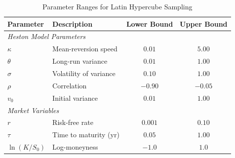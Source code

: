 \begin{table}[htbp]
\centering
\caption{Parameter Ranges for Latin Hypercube Sampling}
\label{tab:param_ranges}
\begin{tabular}{llcc}
\toprule
Parameter & Description & Lower Bound & Upper Bound \\
\midrule
\multicolumn{4}{l}{\textit{Heston Model Parameters}} \\
$\kappa$ & Mean-reversion speed      & $0.01$ & $5.00$ \\
$\theta$ & Long-run variance         & $0.01$ & $1.00$ \\
$\sigma$ & Volatility of variance    & $0.10$ & $1.00$ \\
$\rho$   & Correlation               & $-0.90$ & $-0.05$ \\
$v_0$    & Initial variance          & $0.01$ & $1.00$ \\
\midrule
\multicolumn{4}{l}{\textit{Market Variables}} \\
$r$             & Risk-free rate         & $0.001$ & $0.10$ \\
$\tau$          & Time to maturity (yr)  & $0.05$  & $1.00$ \\
$\ln(K/S_0)$    & Log-moneyness          & $-1.0$  & $1.0$  \\
\bottomrule
\end{tabular}
\end{table}
